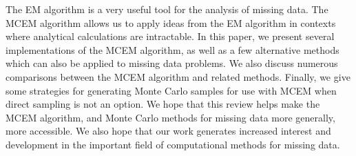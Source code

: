 \documentclass[11pt, oneside]{article}   	%
\begin{document}
The EM algorithm is a very useful tool for the analysis of missing data. The MCEM algorithm allows us to apply ideas from the EM algorithm in contexts where analytical calculations are intractable. In this paper, we present several implementations of the MCEM algorithm, as well as a few alternative methods which can also be applied to missing data problems. We also discuss numerous comparisons between the MCEM algorithm and related methods. Finally, we give some strategies for generating Monte Carlo samples for use with MCEM when direct sampling is not an option. We hope that this review helps make the MCEM algorithm, and Monte Carlo methods for missing data more generally, more accessible. We also hope that our work generates increased interest and development in the important field of computational methods for missing data.



\newpage
\end{document}

